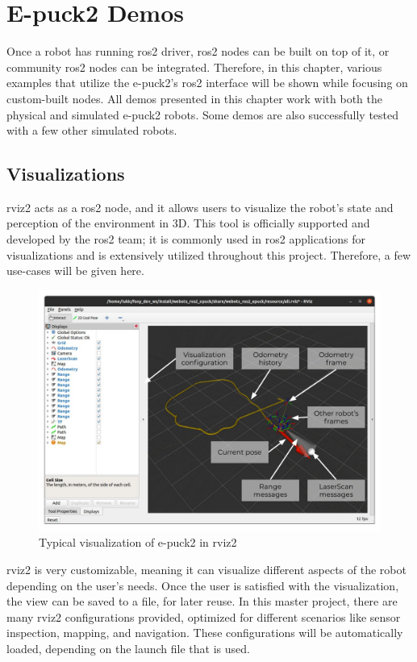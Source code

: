 \chapter{E-puck2 Demos}
\label{chap:demos}

Once a robot has running \ac{ros2} driver, \ac{ros2} nodes can be built on top of it, or community \ac{ros2} nodes can be integrated.
Therefore, in this chapter, various examples that utilize the e-puck2's \ac{ros2} interface will be shown while focusing on custom-built nodes.
All demos presented in this chapter work with both the physical and simulated e-puck2 robots.
Some demos are also successfully tested with a few other simulated robots.

\section{Visualizations}
\acs{rviz2} acts as a \ac{ros2} node, and it allows users to visualize the robot's state and perception of the environment in 3D.
This tool is officially supported and developed by the \ac{ros2} team; it is commonly used in \ac{ros2} applications for visualizations and is extensively utilized throughout this project. 
Therefore, a few use-cases will be given here.

\begin{figure}[H]
    \centering
    \includegraphics[width=\textwidth]{demos/figures/rviz.pdf}
    \caption{Typical visualization of e-puck2 in \acs{rviz2}}
    \label{fig:demos:rviz}
\end{figure}

\ac{rviz2} is very customizable, meaning it can visualize different aspects of the robot depending on the user's needs.
Once the user is satisfied with the visualization, the view can be saved to a file, for later reuse.
In this master project, there are many \ac{rviz2} configurations provided, optimized for different scenarios like sensor inspection, mapping, and navigation.
These configurations will be automatically loaded, depending on the launch file that is used.

